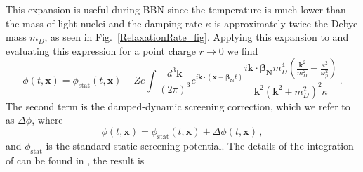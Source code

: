 This expansion is useful during BBN since the temperature is much lower than the mass of light nuclei and the damping rate $\kappa$ is approximately twice the Debye mass $m_D$, as seen in Fig.~\ref{RelaxationRate_fig}. Applying this expansion to  and evaluating this expression for a point charge $r \rightarrow 0$ we find
\begin{equation}\label{eq:ddsint}
\phi(t,\boldsymbol{x}) =\phi_{\text{stat}}(t,\boldsymbol{x})-Ze\int \frac{d^3\boldsymbol{k}}{(2\pi)^3} e^{ i\boldsymbol{k}\cdot(\boldsymbol{x}-\boldsymbol{\beta_{\text{N}}} t)}\frac{i \boldsymbol{k}\cdot \boldsymbol{\beta_{\text{N}}} m_D^4 (\frac{\boldsymbol{k}^2}{m_D^2} - \frac{\kappa^2}{\omega_p^2})}{\boldsymbol{k}^2(\boldsymbol{k}^2+m_D^2)^2\kappa}\,.
\end{equation}
The second term is the damped-dynamic screening correction, which we refer to as $\Delta \phi$, where
\begin{equation}\label{eq:pos_point}
\phi(t,\boldsymbol{x}) = \phi_{\text{stat}}(t,\boldsymbol{x}) +\Delta \phi(t,\boldsymbol{x}) \,,
\end{equation}
and $\phi_{\text{stat}}$ is the standard static screening potential. The details of the integration of  can be found in \cite{Grayson:2023flr}, the result is
